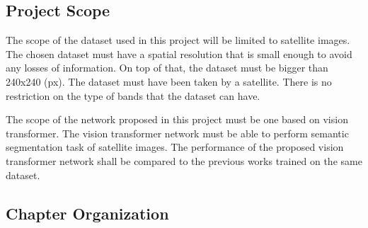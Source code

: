 \subsection{Project Scope}

The scope of the dataset used in this project will be limited to satellite images. The chosen dataset must have a spatial resolution that is small enough to avoid any losses of information. On top of that, the dataset must be bigger than 240x240 (px). The dataset must have been taken by a satellite. There is no restriction on the type of bands that the dataset can have.

The scope of the network proposed in this project must be one based on vision transformer.  The vision transformer network must be able to perform semantic segmentation task of satellite images. The performance of the proposed vision transformer network shall be compared to the  previous works trained on the same dataset.

\subsection{Chapter Organization}

